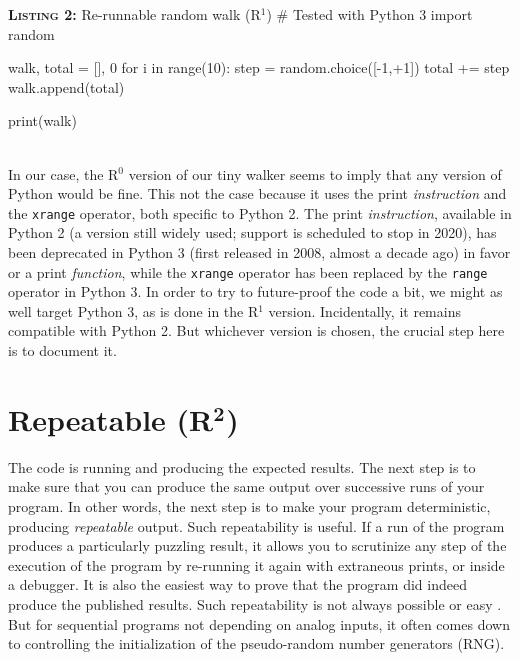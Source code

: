 \documentclass[a4paper,11pt]{article}
\begin{document}
\noindent \begin{minipage}[c]{\linewidth}
\begin{code}{\textbf{\textsc{Listing 2:}} Re-runnable random walk (R$^1$)}
# Tested with Python 3
import random

walk, total = [], 0
for i in range(10):
    step = random.choice([-1,+1])
    total += step
    walk.append(total)

print(walk)
\end{code}
\end{minipage}\\

In our case, the R$^0$ version of our tiny walker seems to imply that any version of Python would be fine. This not the case because it uses the print {\em instruction} and the {\tt xrange} operator, both specific to Python 2. The print {\em instruction}, available in Python 2 (a version still widely used; support is scheduled to stop in 2020), has been deprecated in Python 3 (first released in 2008, almost a decade ago) in favor or a  print {\em function}, while the {\tt xrange} operator has been replaced by the {\tt range} operator in Python 3. In order to try to future-proof the code a bit, we might as well target Python 3, as is done in the R$^1$ version. Incidentally, it remains compatible with Python 2. But whichever version is chosen, the crucial step here is to document it.


\section*{Repeatable (R$^{\mathbf 2}$)}

The code is running and producing the expected results. The next step is to make sure that you can produce the same output over successive runs of your program. In other words, the next step is to make your program deterministic, producing {\em repeatable} output. Such repeatability is useful. If a run of the program produces a particularly puzzling result, it allows you to scrutinize any step of the execution of the program by re-running it again with extraneous prints, or inside a debugger. It is also the easiest way to prove that the program did indeed produce the published results. Such repeatability is not always possible or easy \citep{Diethelm:2012, Courtes:2015}. But for sequential programs not depending on analog inputs, it often comes down to controlling the initialization of the pseudo-random number generators (RNG).\\
\end{document}
